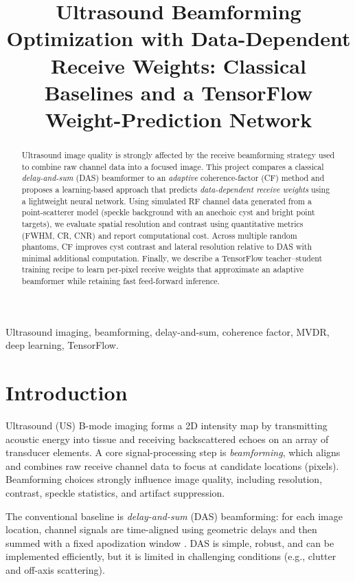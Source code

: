 \documentclass[conference]{IEEEtran}
\title{Ultrasound Beamforming Optimization with Data-Dependent Receive Weights: Classical Baselines and a TensorFlow Weight-Prediction Network}
\author{
\IEEEauthorblockN{Your Name}
\IEEEauthorblockA{Department / Course\\
University of Waterloo\\
Email: your.email@uwaterloo.ca}
}
\begin{document}
\maketitle

\begin{abstract}
Ultrasound image quality is strongly affected by the receive beamforming strategy used to combine raw channel data into a focused image. This project compares a classical \emph{delay-and-sum} (DAS) beamformer to an \emph{adaptive} coherence-factor (CF) method and proposes a learning-based approach that predicts \emph{data-dependent receive weights} using a lightweight neural network. Using simulated RF channel data generated from a point-scatterer model (speckle background with an anechoic cyst and bright point targets), we evaluate spatial resolution and contrast using quantitative metrics (FWHM, CR, CNR) and report computational cost. Across multiple random phantoms, CF improves cyst contrast and lateral resolution relative to DAS with minimal additional computation. Finally, we describe a TensorFlow teacher--student training recipe to learn per-pixel receive weights that approximate an adaptive beamformer while retaining fast feed-forward inference.
\end{abstract}

\begin{IEEEkeywords}
Ultrasound imaging, beamforming, delay-and-sum, coherence factor, MVDR, deep learning, TensorFlow.
\end{IEEEkeywords}

\section{Introduction}
Ultrasound (US) B-mode imaging forms a 2D intensity map by transmitting acoustic energy into tissue and receiving backscattered echoes on an array of transducer elements. A core signal-processing step is \emph{beamforming}, which aligns and combines raw receive channel data to focus at candidate locations (pixels). Beamforming choices strongly influence image quality, including resolution, contrast, speckle statistics, and artifact suppression.

The conventional baseline is \emph{delay-and-sum} (DAS) beamforming: for each image location, channel signals are time-aligned using geometric delays and then summed with a fixed apodization window \cite{vanveen1988beamforming,jensen1996field}. DAS is simple, robust, and can be implemented efficiently, but it is limited in challenging conditions (e.g., clutter and off-axis scattering).
\end{document}
